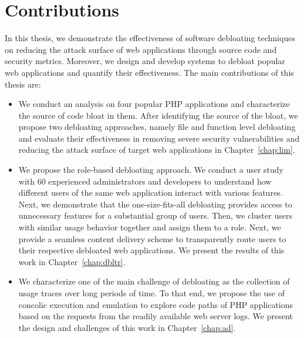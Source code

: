 \section{Contributions}

In this thesis, we demonstrate the effectiveness of software debloating techniques on reducing the attack surface of web applications through source code and security metrics. 
Moreover, we design and develop systems to debloat popular web applications and quantify their effectiveness. The main contributions of this thesis are:

\begin{itemize}
    \item We conduct an analysis on four popular PHP applications and characterize the source of code bloat in them. After identifying the source of the bloat, we propose two debloating approaches, namely file and function level debloating and evaluate their effectiveness in removing severe security vulnerabilities and reducing the attack surface of target web applications in Chapter~\ref{chap:lim}.
    \item We propose the role-based debloating approach. We conduct a user study with 60 experienced administrators and developers to understand how different users of the same web application interact with various features. Next, we demonstrate that the one-size-fits-all debloating provides access to unnecessary features for a substantial group of users. Then, we cluster users with similar usage behavior together and assign them to a role. Next, we provide a seamless content delivery scheme to transparently route users to their respective debloated web applications. We present the results of this work in Chapter~\ref{chap:dbltr}. 
    \item We characterize one of the main challenge of debloating as the collection of usage traces over long periods of time. To that end, we propose the use of concolic execution and emulation to explore code paths of PHP applications based on the requests from the readily available web server logs. We present the design and challenges of this work in Chapter~\ref{chap:ad}.
\end{itemize}
